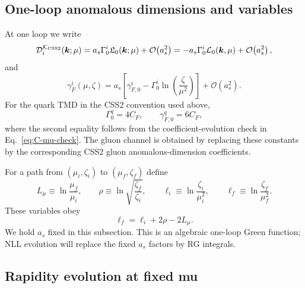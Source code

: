 \documentclass[11pt]{article}
\newcommand{\bk}{\bm{k}}
\newcommand{\order}[1]{\mathcal{O}\!\left(#1\right)}
\newcommand{\KCSS}{\mathcal K_{\rm CSS2}}
\begin{document}
\subsection{One-loop anomalous dimensions and variables}

At one loop we write
\begin{equation}
  \mathcal D_i^{\KCSS}(\bk;\mu)
  =a_s\Gamma_0^i\mathfrak L_0(\bk;\mu)+\order{a_s^2}
  =-a_s\Gamma_0^i\mathcal L_0(\bk,\mu)+\order{a_s^2},
  \label{eq:D-one-loop-green-section}
\end{equation}
and
\begin{equation}
  \gamma_F^i(\mu,\zeta)
  =a_s\left[\gamma_{F,0}^i-\Gamma_0^i\ln\!\left(\frac{\zeta}{\mu^2}\right)\right]
  +\order{a_s^2}.
  \label{eq:gammaF-one-loop-green-section}
\end{equation}
For the quark TMD in the CSS2 convention used above,
\begin{equation}
  \Gamma_0^q=4C_F,
  \qquad
  \gamma_{F,0}^q=6C_F,
  \label{eq:quark-anom-one-loop-green-section}
\end{equation}
where the second equality follows from the coefficient-evolution check in
Eq.~\eqref{eq:C-mu-check}. The gluon channel is obtained by replacing these constants by
the corresponding CSS2 gluon anomalous-dimension coefficients.

For a path from $(\mu_i,\zeta_i)$ to $(\mu_f,\zeta_f)$ define
\begin{equation}
  L_\mu\equiv\ln\frac{\mu_f}{\mu_i},
  \qquad
  \rho\equiv\ln\sqrt{\frac{\zeta_f}{\zeta_i}},
  \qquad
  \ell_i\equiv\ln\frac{\zeta_i}{\mu_i^2},
  \qquad
  \ell_f\equiv\ln\frac{\zeta_f}{\mu_f^2}.
  \label{eq:path-vars-green-section}
\end{equation}
These variables obey
\begin{equation}
  \ell_f=\ell_i+2\rho-2L_\mu.
  \label{eq:ell-relation-green-section}
\end{equation}
We hold $a_s$ fixed in this subsection. This is an algebraic one-loop Green function;
NLL evolution will replace the fixed $a_s$ factors by RG integrals.

\subsection{Rapidity evolution at fixed mu}
\end{document}
